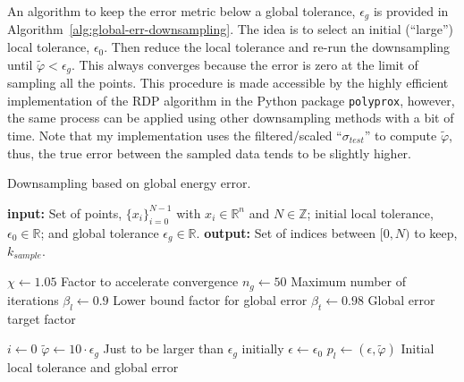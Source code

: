 \documentclass[a4paper,11pt]{article}
\begin{document}
An algorithm to keep the error metric below a global tolerance, $\epsilon_g$ is provided in Algorithm~\ref{alg:global-err-downsampling}.
The idea is to select an initial (``large'') local tolerance, $\epsilon_0$.
Then reduce the local tolerance and re-run the downsampling until $\tilde{\varphi} < \epsilon_{g}$.
This always converges because the error is zero at the limit of sampling all the points.
This procedure is made accessible by the highly efficient implementation of the RDP algorithm in the Python package \texttt{polyprox}, however, the same process can be applied using other downsampling methods with a bit of time.
Note that my implementation uses the filtered/scaled ``$\sigma_{test}$'' to compute $\tilde{\varphi}$, thus, the true error between the sampled data tends to be slightly higher.

\begin{algorithm}
	\caption{Downsampling based on global energy error.}
	\label{alg:global-err-downsampling}
	\begin{algorithmic}[1]
		\State \textbf{input:} Set of points, $\{x_i\}_{i=0}^{N-1}$ with $x_i \in \mathbb{R}^n$ and $N \in \mathbb{Z}$; initial local tolerance, $\epsilon_0 \in \mathbb{R}$; and
        global tolerance $\epsilon_g \in \mathbb{R}$.
        \State \textbf{output:} Set of indices between $[0, N)$ to keep, $k_{sample}$.
        \bigskip

        \State $\chi \gets 1.05$
        \Comment Factor to accelerate convergence
        \State $n_g \gets 50$
        \Comment Maximum number of iterations
        \State $\beta_l \gets 0.9$
        \Comment Lower bound factor for global error
        \State $\beta_t \gets 0.98$
        \Comment Global error target factor
        \smallskip

        \State $i \gets 0$
        \State $\tilde{\varphi} \gets 10 \cdot \epsilon_g$
        \Comment Just to be larger than $\epsilon_g$ initially
        \State $\epsilon \gets \epsilon_0$
        \State $p_l \gets (\epsilon, \tilde{\varphi})$
        \Comment Initial local tolerance and global error
        \smallskip


\end{algorithmic}
\end{algorithm}
\end{document}
